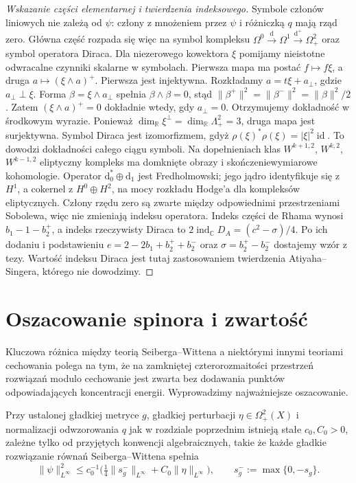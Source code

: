 \begin{proof}[Wskazanie części elementarnej i twierdzenia indeksowego]
Symbole członów liniowych nie zależą od $\psi$:
człony z mnożeniem przez $\psi$ i różniczką $q$ mają rząd zero.
Główna część rozpada się więc na symbol kompleksu
$\Omega^0\xrightarrow{\mathrm d}\Omega^1
\xrightarrow{\mathrm d^+}\Omega^2_+$ oraz symbol operatora Diraca.
Dla niezerowego kowektora $\xi$ pomijamy
nieistotne odwracalne czynniki skalarne w symbolach.
Pierwsza mapa ma postać $f\mapsto f\xi$,
a druga $a\mapsto(\xi\wedge a)^+$.
Pierwsza jest injektywna. Rozkładamy
$a=t\xi+a_\perp$, gdzie $a_\perp\perp\xi$.
Forma $\beta=\xi\wedge a_\perp$ spełnia
$\beta\wedge\beta=0$, stąd
$\|\beta^+\|^2=\|\beta^-\|^2=\|\beta\|^2/2$.
Zatem $(\xi\wedge a)^+=0$ dokładnie wtedy,
gdy $a_\perp=0$. Otrzymujemy dokładność
w środkowym wyrazie. Ponieważ
$\dim_\mathbb R\xi^\perp=\dim_\mathbb R\Lambda^2_+=3$,
druga mapa jest surjektywna.
Symbol Diraca jest izomorfizmem, gdyż
$\rho(\xi)^*\rho(\xi)=|\xi|^2\operatorname{id}$.
To dowodzi dokładności całego ciągu symboli.
Na dopełnieniach klas $W^{k+1,2}$, $W^{k,2}$,
$W^{k-1,2}$ eliptyczny kompleks ma domknięte
obrazy i skończeniewymiarowe kohomologie.
Operator $\mathrm d_0^*\oplus\mathrm d_1$
jest Fredholmowski; jego jądro identyfikuje się
z $H^1$, a cokernel z $H^0\oplus H^2$,
na mocy rozkładu Hodge'a dla kompleksów eliptycznych.
Człony rzędu zero są zwarte między odpowiednimi
przestrzeniami Sobolewa, więc nie zmieniają
indeksu operatora.
Indeks części de Rhama wynosi $b_1-1-b_2^+$,
a indeks rzeczywisty Diraca to
$2\operatorname{ind}_{\mathbb C}D_A=(c^2-\sigma)/4$.
Po ich dodaniu i podstawieniu
$e=2-2b_1+b_2^++b_2^-$ oraz
$\sigma=b_2^+-b_2^-$ dostajemy wzór z tezy.
Wartość indeksu Diraca jest tutaj zastosowaniem
twierdzenia Atiyaha--Singera, którego nie dowodzimy.
\end{proof}

\section{Oszacowanie spinora i zwartość}
\label{sec:tg-sw-compact}

Kluczowa różnica między teorią Seiberga--Wittena a niektórymi
innymi teoriami cechowania polega na tym, że na zamkniętej
czterorozmaitości przestrzeń rozwiązań modulo cechowanie
jest zwarta bez dodawania punktów odpowiadających
koncentracji energii. Wyprowadzimy najważniejsze oszacowanie.

\begin{lemat}
\label{lem:tg-sw-bound}
Przy ustalonej gładkiej metryce $g$, gładkiej perturbacji
$\eta\in\Omega^2_+(X)$ i normalizacji odwzorowania $q$
jak w rozdziale poprzednim istnieją stałe $c_0,C_0>0$,
zależne tylko od przyjętych konwencji algebraicznych, takie że
każde gładkie rozwiązanie równań Seiberga--Wittena spełnia
\[
\|\psi\|_{L^\infty}^2\le
c_0^{-1}\bigl(\tfrac14\|s_g^-\|_{L^\infty}
+C_0\|\eta\|_{L^\infty}\bigr),
\qquad s_g^-:=\max\{0,-s_g\}.
\]
\end{lemat}

